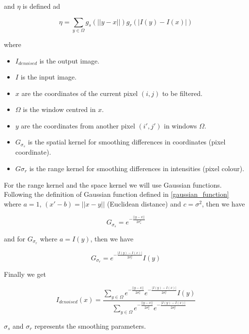 \documentclass[titlepage,12pt]{report}
\begin{document}
and $\eta$ is defined ad

\begin{equation}
\eta = \sum_{y \in \Omega} g_s(||y - x||) g_r(|I(y) - I(x)|)
\end{equation}

where

\begin{itemize}
\item $I_{denoised}$ is the output image.
\item $I$ is the input image.
\item $x$ are the coordinates of the current pixel $(i,j)$ to be filtered.
\item $\Omega$ is the window centred in $x$.
\item $y$ are the coordinates from another pixel $(i', j')$ in windows $\Omega$.
\item $G_{\sigma_s}$ is the spatial kernel for smoothing differences in coordinates (pixel coordinate).
\item $G{\sigma_r}$ is the range kernel for smoothing differences in intensities (pixel colour).

\end{itemize}

For the range kernel and the space kernel we will use Gaussian functions. Following the definition of Gaussian function defined in \ref{gaussian_function} where $a = 1$, $(x' - b) = ||x - y||$ (Euclidean distance) and $c = \sigma^2$, then we have

\begin{equation}
G_{\sigma_s} = e^{- \frac{||y - x||}{2 \sigma_{s}^{2}}}
\end{equation}

and for $G_{\sigma_r}$ where $a = I(y)$, then we have

\begin{equation}
G_{\sigma_r} = e^{- \frac{|I(y) - I(x)|}{2 \sigma_{r}^{2}}} I(y)
\end{equation}

Finally we get

\begin{equation}
I_{denoised}(x) = \frac{\sum_{y \in \Omega} e^{- \frac{||y - x||}{2 \sigma_{s}^{2}}} e^{- \frac{|I(y) - I(x)|}{2 \sigma_{r}^{2}}} I(y)}{\sum_{y \in \Omega}e^{- \frac{||y - x||}{2 \sigma_{s}^{2}}} e^{- \frac{|I(y) - I(x)|}{2 \sigma_{r}^{2}}}}
\end{equation}

$\sigma_s$ and $\sigma_r$ represents the smoothing parameters.
\end{document}
